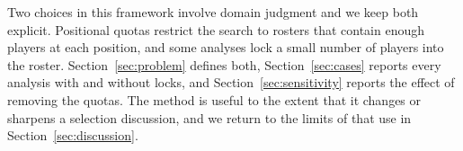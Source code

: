 Two choices in this framework involve domain judgment and we keep both explicit. Positional quotas restrict the search to rosters that contain enough players at each position, and some analyses lock a small number of players into the roster. Section~\ref{sec:problem} defines both, Section~\ref{sec:cases} reports every analysis with and without locks, and Section~\ref{sec:sensitivity} reports the effect of removing the quotas. The method is useful to the extent that it changes or sharpens a selection discussion, and we return to the limits of that use in Section~\ref{sec:discussion}.
